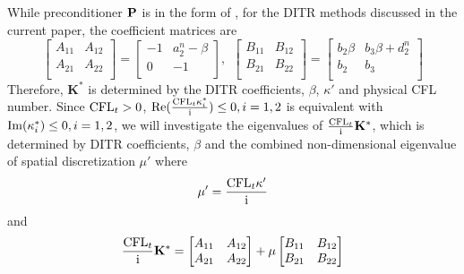 While preconditioner $\mathbf{P}$ is in the form of ,
for the DITR methods discussed in the current paper,
the coefficient matrices are
\begin{equation}
    \begin{bmatrix}
        A_{11} & A_{12} \\
        A_{21} & A_{22} \\
    \end{bmatrix} = \begin{bmatrix}
        -1 & a_2^n - \beta \\
        0  & -1            \\
    \end{bmatrix},\ \
    \begin{bmatrix}
        B_{11} & B_{12} \\
        B_{21} & B_{22} \\
    \end{bmatrix} = \begin{bmatrix}
        b_2\beta & b_3\beta + d_2^n \\
        b_2      & b_3              \\
    \end{bmatrix}
    \label{eq:ABBetaForm}
\end{equation}
Therefore, $\mathbf{K}^*$ is determined by the DITR coefficients,
$\beta$, $\kappa'$ and physical CFL number.
Since $\text{CFL}_t > 0$, $\mathrm{Re}(\frac{\text{CFL}_t\kappa^*_i}{\mathrm{i}}) \leq 0, i=1,2$
is equivalent with $\mathrm{Im}(\kappa^*_i) \leq 0, i=1,2$,
we will investigate the eigenvalues of
$\frac{\text{CFL}_t}{\mathrm{i}}\mathbf{K}^*$, which is
determined by DITR coefficients, $\beta$ and the
combined non-dimensional eigenvalue of spatial  discretization $\mu'$
where
\begin{equation}
    \mu' = \frac{\text{CFL}_t \kappa'}{\mathrm{i}}
\end{equation}
and
\begin{equation}
    \frac{\text{CFL}_t}{\mathrm{i}}\mathbf{K}^* = \begin{bmatrix}
        A_{11} & A_{12} \\
        A_{21} & A_{22} \\
    \end{bmatrix} + \mu \begin{bmatrix}
        B_{11} & B_{12} \\
        B_{21} & B_{22} \\
    \end{bmatrix}
\end{equation}

